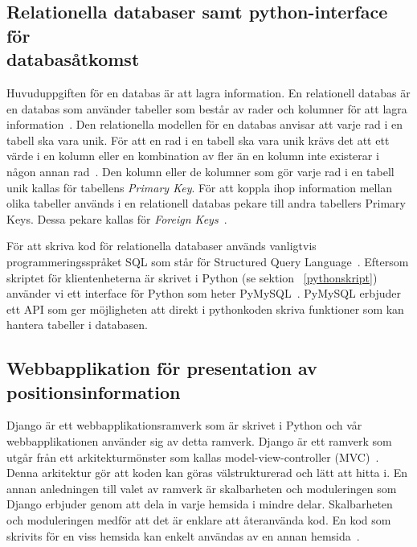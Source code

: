 \documentclass[a4paper,12pt]{article}
\begin{document}
\subsection{Relationella databaser samt python-interface för \\databasåtkomst} \label{relationella_databaser}
Huvuduppgiften för en databas är att lagra information. En relationell databas är en databas som använder tabeller som består av rader och kolumner för att lagra information~\cite{database_fundamentals}. Den relationella modellen för en databas anvisar att varje rad i en tabell ska vara unik. För att en rad i en tabell ska vara unik krävs det att ett värde i en kolumn eller en kombination av fler än en kolumn inte existerar i någon annan rad~\cite{database_fundamentals}. Den kolumn eller de kolumner som gör varje rad i en tabell unik kallas för tabellens \textit{Primary Key}.
För att koppla ihop information mellan olika tabeller används i en relationell databas pekare till andra tabellers Primary Keys. Dessa pekare kallas för \textit{Foreign Keys}~\cite{database_fundamentals}.

För att skriva kod för relationella databaser används vanligtvis programmeringsspråket SQL som står för Structured Query Language~\cite{sql}.
Eftersom skriptet för klientenheterna är skrivet i Python (se sektion ~\ref{pythonskript}) använder vi ett interface för Python som heter PyMySQL~\cite{pymysql}. PyMySQL erbjuder ett API som ger möjligheten att direkt i pythonkoden skriva funktioner som kan hantera tabeller i databasen.


 \subsection{Webbapplikation för presentation av positionsinformation}\label{django}
 Django är ett webbapplikationsramverk som är skrivet i Python och vår webbapplikationen använder sig av detta ramverk. Django är ett ramverk som utgår från ett arkitekturmönster som kallas model-view-controller (MVC)~\cite{djangoMVC}. Denna arkitektur gör att koden kan göras välstrukturerad och lätt att hitta i. En annan anledningen till valet av ramverk är skalbarheten och moduleringen som Django erbjuder genom att dela in varje hemsida i mindre delar. Skalbarheten och moduleringen medför att det är enklare att återanvända kod. En kod som skrivits för en viss hemsida kan enkelt användas av en annan hemsida~\cite{djangoMVC}.
\end{document}
